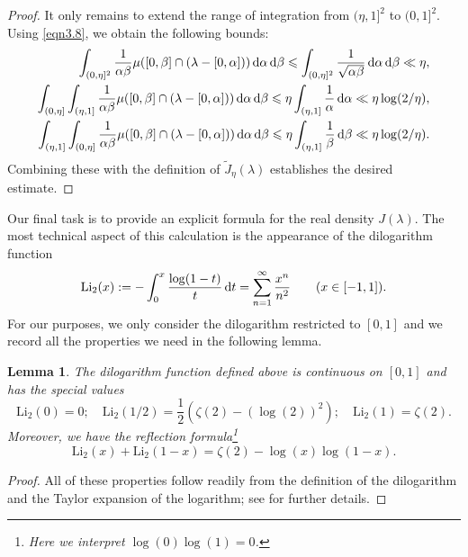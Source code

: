 \documentclass[12pt,reqno]{amsart}
\newtheorem{lemma}[theorem]{Lemma}
\theoremstyle{definition}
\theoremstyle{remark}
\numberwithin{equation}{section}
\def\d{{\,{\rm d}}}
\def \Li {\mathrm{Li}}
\newcommand\1{\mathds{1}}
\begin{document}
\begin{proof}
It only remains to extend the range of integration from $(\eta,1]^2$ to $(0,1]^2$. Using \eqref{eqn3.8}, we obtain the following bounds:
\begin{align*}
    \int_{(0,\eta]^2} \frac{1}{\alpha\beta} \mu( [0,\beta] \cap ( \lambda- [0,\alpha]) )\d\alpha \d\beta \leqslant \int_{(0,\eta]^2} \frac{1}{\sqrt{\alpha\beta}} \d\alpha\d\beta \ll \eta,\\
    \int_{(0,\eta]}\int_{(\eta,1]}\frac{1}{\alpha\beta} \mu( [0,\beta] \cap ( \lambda- [0,\alpha]) )\d\alpha \d\beta\leqslant \eta\int_{(\eta,1]}\frac{1}{\alpha}\d\alpha  \ll \eta\log(2/\eta),\\
    \int_{(\eta,1]}\int_{(0,\eta]}\frac{1}{\alpha\beta} \mu( [0,\beta] \cap ( \lambda- [0,\alpha]) )\d\alpha \d\beta\leqslant \eta\int_{(\eta,1]}\frac{1}{\beta}\d\beta  \ll \eta\log(2/\eta).
\end{align*}
Combining these with the definition of $\widetilde{J}_\eta(\lambda)$ establishes the desired estimate.
    \end{proof}

Our final task is to provide an explicit formula for the real density $J(\lambda)$. 
The most technical aspect of this calculation is the appearance of the dilogarithm function
\begin{equation} \label{eqn5.4}
    \Li_2(x):=-\int_0^x\frac{\log(1-t)}{t}\d t = \sum_{n=1}^\infty\frac{x^n}{n^2}\qquad (x\in[-1,1]).
\end{equation}
For our purposes, we only consider the dilogarithm restricted to $[0,1]$ and we record all the properties we need in the following lemma.
\begin{lemma}\label{lem5.4}
    The dilogarithm function defined above is continuous on $[0,1]$ and has the special values
    \begin{equation*}
        \Li_2(0) = 0;\quad \Li_2(1/2) = \frac{1}{2}(\zeta(2) - (\log(2))^2);\quad \Li_2(1) = \zeta(2).
    \end{equation*}
    Moreover, we have the \emph{reflection formula}\footnote{Here we interpret $\log(0)\log(1) = 0$.}
    \begin{equation*}
        \Li_2(x) + \Li_2(1-x) = \zeta(2) - \log(x)\log(1-x).
    \end{equation*}
\end{lemma}
\begin{proof}
    All of these properties follow readily from the definition of the dilogarithm and the Taylor expansion of the logarithm; see \cite{dilog} for further details.
\end{proof}
\end{document}

